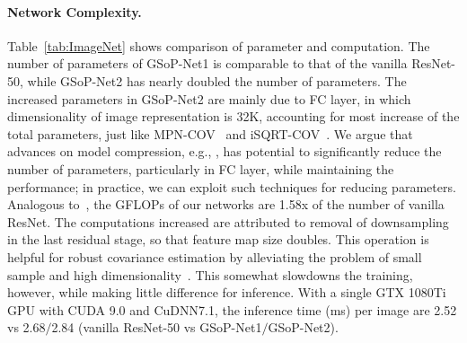 \documentclass[10pt,twocolumn,letterpaper]{article}
\begin{document}
\vspace{-8pt}\paragraph{Network Complexity.}  Table~\ref{tab:ImageNet} shows  comparison of parameter and computation.  The number of parameters of GSoP-Net1 is comparable to that of the vanilla ResNet-50, while GSoP-Net2 has nearly doubled  the number of parameters. The increased parameters in GSoP-Net2 are mainly due to FC layer, in which dimensionality of image representation is 32K, accounting for most increase of the total parameters, just like MPN-COV~\cite{Li_2017_ICCV} and iSQRT-COV~\cite{Li_2018_CVPR}. We argue that advances on model compression, e.g., \cite{denton2014exploiting,Rastegari2016XNOR,han2015learning},  has potential to significantly  reduce the number of  parameters, particularly in FC layer,  while maintaining the performance; in practice, we can exploit such techniques  for reducing parameters. Analogous  to~\cite{Li_2017_ICCV,Li_2018_CVPR}, the GFLOPs of our  networks are 1.58x of the number of vanilla  ResNet. The computations increased are attributed to removal of downsampling  in the last residual stage, so that feature map size doubles. This operation is  helpful for robust covariance estimation by alleviating the problem of small sample and high dimensionality~\cite{Li_2017_ICCV}. This somewhat slowdowns the training, however, while making little difference for  inference. With a single GTX 1080Ti GPU with CUDA 9.0 and CuDNN7.1, the inference time (ms) per image are 2.52 vs 2.68$/$2.84 (vanilla ResNet-50 vs GSoP-Net1$/$GSoP-Net2). 
\end{document}
